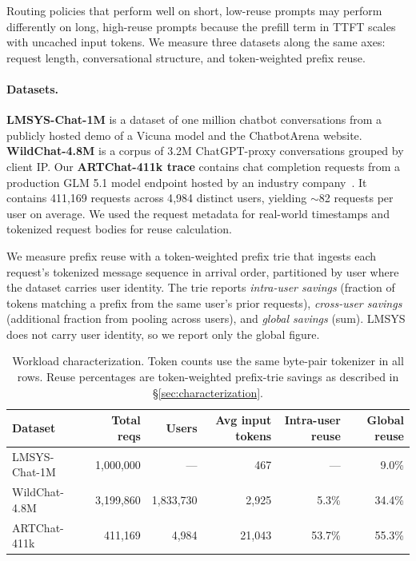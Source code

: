 \documentclass{article}
\begin{document}
Routing policies that perform well on short, low-reuse prompts may perform
differently on long, high-reuse prompts because the prefill term in TTFT scales
with uncached input tokens. We measure three datasets along the same axes:
request length, conversational structure, and token-weighted prefix reuse.

\paragraph{Datasets.}
\textbf{LMSYS-Chat-1M} \citep{lmsys2024} is a dataset of one million chatbot conversations from a publicly hosted demo of a Vicuna model and the ChatbotArena website. \textbf{WildChat-4.8M} \citep{wildchat2024} is a corpus
of 3.2M ChatGPT-proxy conversations grouped by client IP. Our \textbf{ARTChat-411k
trace} contains chat completion requests from a production
GLM 5.1 model endpoint hosted by an industry company~\citep{glm2024}. It contains 411{,}169 requests across 4{,}984 distinct
users, yielding $\sim$82 requests per user on average. We used the request metadata for real-world timestamps and tokenized request bodies for reuse calculation.

We measure prefix reuse with a token-weighted prefix trie that ingests each
request's tokenized message sequence in arrival order, partitioned by user where
the dataset carries user identity. The trie reports \textit{intra-user savings}
(fraction of tokens matching a prefix from the same user's prior requests),
\textit{cross-user savings} (additional fraction from pooling across users), and
\textit{global savings} (sum). LMSYS does not carry user identity, so we report
only the global figure.

\begin{table}[t]
\centering
\small
\caption{Workload characterization. Token counts use the same byte-pair
  tokenizer in all rows. Reuse percentages are token-weighted prefix-trie
  savings as described in \S\ref{sec:characterization}.}
\label{tab:datasets}
\begin{tabular}{lrrrrr}
\toprule
Dataset & Total reqs & Users & Avg input tokens & Intra-user reuse & Global reuse \\
\midrule
LMSYS-Chat-1M & 1{,}000{,}000 & --- & 467 & --- & 9.0\% \\
WildChat-4.8M & 3{,}199{,}860 & 1{,}833{,}730 & 2{,}925 & 5.3\% & 34.4\% \\
ARTChat-411k & 411{,}169 & 4{,}984 & 21{,}043 & 53.7\% & 55.3\% \\
\bottomrule
\end{tabular}
\end{table}
\end{document}
